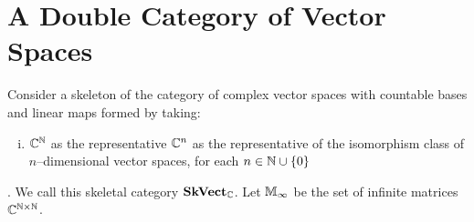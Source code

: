 \documentclass[./Thick_TQFTs_and_Quantum_Information.tex]{subfiles}
\begin{document}
\section{A Double Category of Vector Spaces}

Consider a skeleton of the category of complex vector spaces with countable
bases and linear maps formed by taking:
\begin{enumerate}[(i)]
\item $\mathbb{C}^{\mathbb{N}}$ as the representative
$\mathbb{C}^n$ as the representative of the
isomorphism class of $n$--dimensional vector spaces, for each $n \in \N \cup
\set{0}$
\end{enumerate}. We call this skeletal category $\textbf{SkVect}_{\mathbb{C}}$. Let $\mathbb{M}_{\infty}$ be
the set of infinite matrices $\mathbb{C}^{\mathbb{N} \times \mathbb{N}}$.
\end{document}
